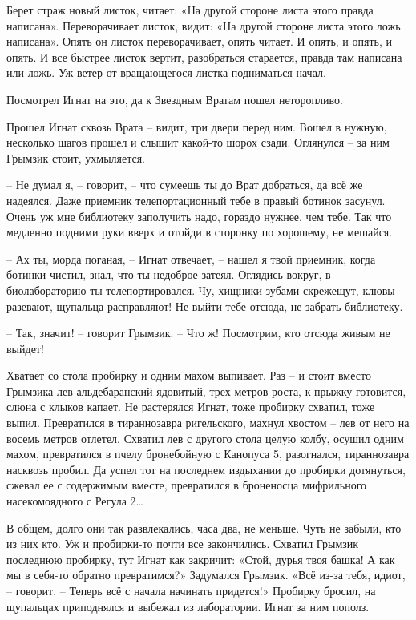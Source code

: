 \documentclass[ebook,oneside,final,openright]{memoir}
\begin{document}
\par
Берет страж новый листок, читает: «На другой стороне листа этого правда написана». Переворачивает листок, видит: «На другой стороне листа этого ложь написана». Опять он листок переворачивает, опять читает. И опять, и опять, и опять. И все быстрее листок вертит, разобраться старается, правда там написана или ложь. Уж ветер от вращающегося листка подниматься начал. \par
\par
Посмотрел Игнат на это, да к Звездным Вратам пошел неторопливо.\par
\par
\par
Прошел Игнат сквозь Врата – видит, три двери перед ним. Вошел в нужную, несколько шагов прошел и слышит какой-то шорох сзади. Оглянулся – за ним Грымзик стоит, ухмыляется. \par
\par
– Не думал я, – говорит, – что сумеешь ты до Врат добраться, да всё же надеялся. Даже приемник телепортационный тебе в правый ботинок засунул. Очень уж мне библиотеку заполучить надо, гораздо нужнее, чем тебе. Так что медленно подними руки вверх и отойди в сторонку по хорошему, не мешайся.\par
– Ах ты, морда поганая, – Игнат отвечает, – нашел я твой приемник, когда ботинки чистил, знал, что ты недоброе затеял. Оглядись вокруг, в биолабораторию ты телепортировался. Чу, хищники зубами скрежещут, клювы разевают, щупальца расправляют! Не выйти тебе отсюда, не забрать библиотеку.\par
– Так, значит! – говорит Грымзик. – Что ж! Посмотрим, кто отсюда живым не выйдет!\par
\par
Хватает со стола пробирку и одним махом выпивает. Раз – и стоит вместо Грымзика лев альдебаранский ядовитый, трех метров роста, к прыжку готовится, слюна с клыков капает. Не растерялся Игнат, тоже пробирку схватил, тоже выпил. Превратился в тираннозавра ригельского, махнул хвостом – лев от него на восемь метров отлетел. Схватил лев с другого стола целую колбу, осушил одним махом, превратился в пчелу бронебойную с Канопуса 5, разогнался, тираннозавра насквозь пробил. Да успел тот на последнем издыхании до пробирки дотянуться, сжевал ее с содержимым вместе, превратился в броненосца мифрильного насекомоядного с Регула 2…\par
\par
В общем, долго они так развлекались, часа два, не меньше. Чуть не забыли, кто из них кто. Уж и пробирки-то почти все закончились. Схватил Грымзик последнюю пробирку, тут Игнат как закричит: «Стой, дурья твоя башка! А как мы в себя-то обратно превратимся?» Задумался Грымзик. «Всё из-за тебя, идиот, – говорит. – Теперь всё с начала начинать придется!» Пробирку бросил, на щупальцах приподнялся и выбежал из лаборатории. Игнат за ним пополз.\par
\end{document}
